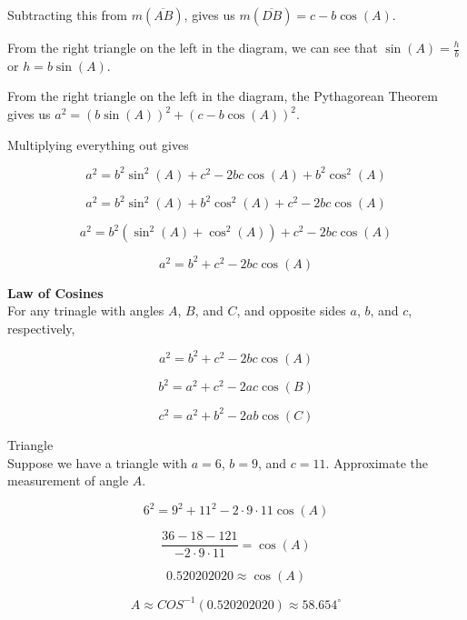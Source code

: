 \documentclass{ximera}
\begin{document}
Subtracting this from $m(\overline{AB})$, gives us $m(\overline{DB}) = c - b \cos(A)$.


From the right triangle on the left in the diagram, we can see that $\sin(A) = \frac{h}{b}$ or $h = b \sin(A)$.




From the right triangle on the left in the diagram, the Pythagorean Theorem gives us $a^2 = (b \sin(A))^2 + (c - b \cos(A))^2$.


Multiplying everything out gives


\[    a^2 = b^2 \sin^2(A) +  c^2  - 2 b c \cos(A) + b^2 \cos^2(A)  \]


\[    a^2 = b^2 \sin^2(A) + b^2 \cos^2(A) +  c^2  - 2 b c \cos(A)   \]


\[    a^2 = b^2 (\sin^2(A) + \cos^2(A)) +  c^2  - 2 b c \cos(A)   \]


\[    a^2 = b^2  +  c^2  - 2 b c \cos(A)   \]












\begin{theorem}  \textbf{\textcolor{green!50!black}{Law of Cosines}}  \\



For any trinagle with angles $A$, $B$, and $C$, and opposite sides $a$, $b$, and $c$, respectively, 


\[    a^2 = b^2  +  c^2  - 2 b c \cos(A)   \]

\[    b^2 = a^2  +  c^2  - 2 a c \cos(B)   \]

\[    c^2 = a^2  +  b^2  - 2 a b \cos(C)   \]


\end{theorem}










\begin{example} Triangle \\

Suppose we have a triangle with $a=6$, $b=9$, and $c=11$. Approximate the measurement of angle $A$.

\[    6^2 = 9^2  +  11^2  - 2 \cdot 9 \cdot 11 \cos(A)   \]


\[    \frac{36 - 18 - 121}{- 2 \cdot 9 \cdot 11} =    \cos(A)   \]

\[  0.520202020 \approx \cos(A)  \]


\[ A \approx COS^{-1}(0.520202020)  \approx 58.654^{\circ}   \]


\end{example}
\end{document}
